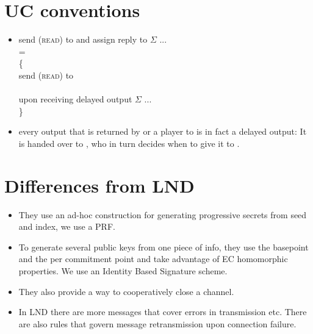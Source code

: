 \section{UC conventions}
  \begin{itemize}
    \item send (\textsc{read}) to \ledger{} and assign reply to $\Sigma$ ... \\
    = \\
    \{ \\
    send (\textsc{read}) to \ledger{} \\ \ \\
    upon receiving delayed output $\Sigma$ ... \\
    \}
    \item every output that is returned by \fpaynet{} or a player to
    \environment{} is in fact a delayed output: It is handed over to
    \adversary{}, who in turn decides when to give it to \environment{}.
  \end{itemize}

\section{Differences from LND}
  \begin{itemize}
    \item They use an ad-hoc construction for generating progressive secrets
    from seed and index, we use a PRF.
    \item To generate several public keys from one piece of info, they use the
    basepoint and the per commitment point and take advantage of EC homomorphic
    properties. We use an Identity Based Signature scheme.
    \item They also provide a way to cooperatively close a channel.
    \item In LND there are more messages that cover errors in transmission etc.
    There are also rules that govern message retransmission upon connection
    failure.
  \end{itemize}
